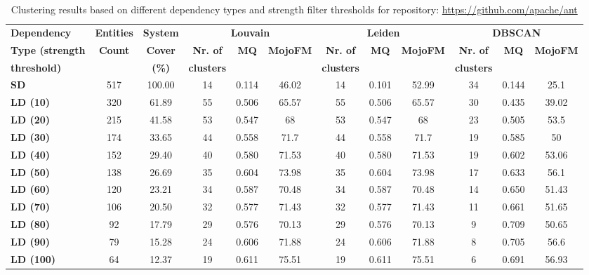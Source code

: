 \documentclass{ieeeaccess}
\begin{document}
\begin{table}[htbp]
\centering
\caption{Clustering results based on different dependency types and strength filter thresholds for repository: \url{https://github.com/apache/ant}}
\label{tab:clustering_results_ant}
\setlength{\tabcolsep}{7pt} 
\begin{tabular}{|l|c|c|ccc|ccc|ccc|}
\hline
 \textbf{Dependency} &  \textbf{Entities} & \textbf{System} & \multicolumn{3}{c|}{\textbf{Louvain}} & \multicolumn{3}{c|}{\textbf{Leiden}} & \multicolumn{3}{c|}{\textbf{DBSCAN}} \\
\cline{4-12}
\textbf{Type (strength } &  \textbf{Count} & \textbf{Cover} & \textbf{Nr. of } & \textbf{MQ} & \textbf{MojoFM} & \textbf{Nr. of} & \textbf{MQ} & \textbf{MojoFM} & \textbf{Nr. of} & \textbf{MQ} & \textbf{MojoFM}  \\
\textbf{threshold)} &  & \textbf{(\%)} & \textbf{clusters} & & & \textbf{clusters} & &  & \textbf{clusters} & &\\
\hline
\rowcolor[HTML]{ECECEC} \textbf{SD} & 517 & 100.00 & 14 & 0.114 & 46.02 & 14 & 0.101 & 52.99 & 34 & 0.144 & 25.1  \\
\textbf{LD (10)} & 320 & 61.89 & 55 & 0.506 & 65.57 & 55 & 0.506 & 65.57 & 30 & 0.435 & 39.02 \\
\textbf{LD (20)} & 215 & 41.58 & 53 & 0.547 & 68 & 53 & 0.547 & 68 & 23 & 0.505 & 53.5 \\
\textbf{LD (30)} & 174 & 33.65 & 44 & 0.558 & 71.7 & 44 & 0.558 & 71.7 & 19 & 0.585 & 50 \\
\textbf{LD (40)} & 152 & 29.40 & 40 & 0.580 & 71.53 & 40 & 0.580 & 71.53 & 19 & 0.602 & 53.06 \\
\textbf{LD (50)} & 138 & 26.69 & 35 & 0.604 & 73.98 & 35 & 0.604 & 73.98 & 17 & 0.633 & 56.1 \\
\textbf{LD (60)} & 120 & 23.21 & 34 & 0.587 & 70.48 & 34 & 0.587 & 70.48 & 14 & 0.650 & 51.43 \\
\textbf{LD (70)} & 106 & 20.50 & 32 & 0.577 & 71.43 & 32 & 0.577 & 71.43 & 11 & 0.661 & 51.65 \\
\textbf{LD (80)} & 92 & 17.79 & 29 & 0.576 & 70.13 & 29 & 0.576 & 70.13 & 9 & \cellcolor[HTML]{FEF9E4}0.709 & 50.65 \\
\textbf{LD (90)} & 79 & 15.28 & 24 & 0.606 & 71.88 & 24 & 0.606 & 71.88 & 8 & 0.705 & 56.6 \\
\textbf{LD (100)} & 64 & 12.37 & 19 & \cellcolor[HTML]{fef9e4}0.611 & \cellcolor[HTML]{fef9e4}75.51 & 19 & \cellcolor[HTML]{fef9e4}0.611 & \cellcolor[HTML]{fef9e4}75.51 & 6 & 0.691 & \cellcolor[HTML]{fef9e4}56.93 \\

\end{tabular}
\end{table}
\end{document}
